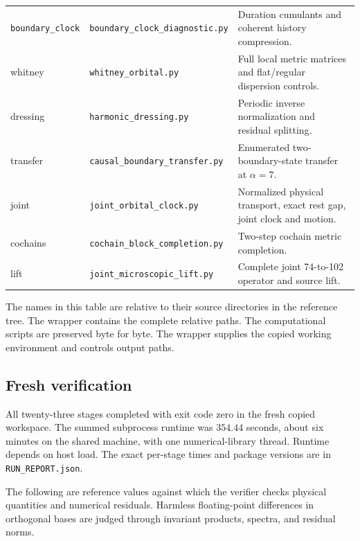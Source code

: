 \begin{longtable}{@{}L{0.15\textwidth}L{0.35\textwidth}L{0.44\textwidth}@{}}
\nolinkurl{boundary_clock} & \nolinkurl{boundary_clock_diagnostic.py} & Duration cumulants and coherent history compression.\\
whitney & \nolinkurl{whitney_orbital.py} & Full local metric matrices and flat/regular dispersion controls.\\
dressing & \nolinkurl{harmonic_dressing.py} & Periodic inverse normalization and residual splitting.\\
transfer & \nolinkurl{causal_boundary_transfer.py} & Enumerated two-boundary-state transfer at $\alpha=7$.\\
joint & \nolinkurl{joint_orbital_clock.py} & Normalized physical transport, exact rest gap, joint clock and motion.\\
cochains & \nolinkurl{cochain_block_completion.py} & Two-step cochain metric completion.\\
lift & \nolinkurl{joint_microscopic_lift.py} & Complete joint 74-to-102 operator and source lift.\\
\end{longtable}

The names in this table are relative to their source directories in the reference tree. The wrapper contains the complete relative paths. The computational scripts are preserved byte for byte. The wrapper supplies the copied working environment and controls output paths.

\subsection{Fresh verification}

All twenty-three stages completed with exit code zero in the fresh copied workspace. The summed subprocess runtime was $354.44$ seconds, about six minutes on the shared machine, with one numerical-library thread. Runtime depends on host load. The exact per-stage times and package versions are in \texttt{RUN\_REPORT.json}.

The following are reference values against which the verifier checks physical quantities and numerical residuals. Harmless floating-point differences in orthogonal bases are judged through invariant products, spectra, and residual norms.

